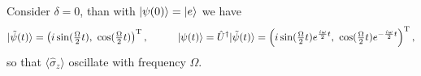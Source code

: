 Consider $\delta=0$, than with $\left| \psi(0) \right\rangle = \left| e \right\rangle$ we have
\begin{equation*}
	|\tilde{\psi}(t) \rangle = \left(i \sin(\tfrac{\Omega}{2}t),\ \cos(\tfrac{\Omega}{2}t)\right)\T,
	\hspace{10 mm} 
	\ket{\psi(t)} = \hat{U}\D |\tilde{\psi}(t) \rangle = \left(i \sin(\tfrac{\Omega}{2}t) e^{\frac{i \omega}{2} t },\ \cos(\tfrac{\Omega}{2}t)e^{-\frac{i \omega}{2} t  }\right)\T,
\end{equation*}
so that $\langle \hat{\sigma}_z\rangle$ oscillate with frequency $\Omega$.